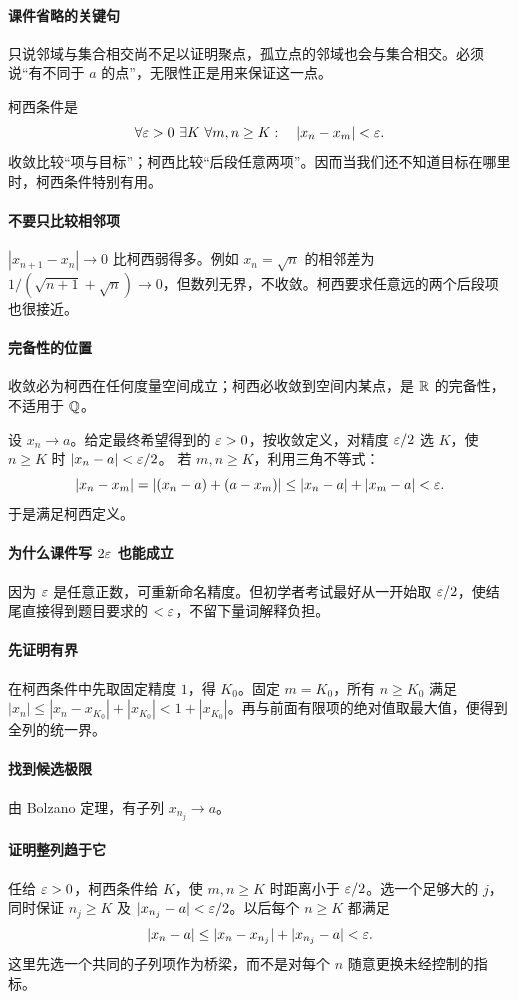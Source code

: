 \paragraph{课件省略的关键句}只说邻域与集合相交尚不足以证明聚点，孤立点的邻域也会与集合相交。必须说“有不同于 $a$ 的点”，无限性正是用来保证这一点。

柯西条件是
\[\forall\eps>0\ \exists K\ \forall m,n\ge K:\quad |x_n-x_m|<\eps.\]
收敛比较“项与目标”；柯西比较“后段任意两项”。因而当我们还不知道目标在哪里时，柯西条件特别有用。
\paragraph{不要只比较相邻项}$|x_{n+1}-x_n|\to0$ 比柯西弱得多。例如 $x_n=\sqrt n$ 的相邻差为 $1/(\sqrt{n+1}+\sqrt n)\to0$，但数列无界，不收敛。柯西要求任意远的两个后段项也很接近。
\paragraph{完备性的位置}收敛必为柯西在任何度量空间成立；柯西必收敛到空间内某点，是 $\mathbb{R}$ 的完备性，不适用于 $\mathbb{Q}$。

设 $x_n\to a$。给定最终希望得到的 $\varepsilon>0$，按收敛定义，对精度 $\varepsilon/2$ 选 $K$，使 $n\ge K$ 时 $|x_n-a|<\varepsilon/2$。
若 $m,n\ge K$，利用三角不等式：
\[|x_n-x_m|=|(x_n-a)+(a-x_m)|\le|x_n-a|+|x_m-a|<\varepsilon.\]
于是满足柯西定义。
\paragraph{为什么课件写 $2\varepsilon$ 也能成立}因为 $\varepsilon$ 是任意正数，可重新命名精度。但初学者考试最好从一开始取 $\varepsilon/2$，使结尾直接得到题目要求的 $<\varepsilon$，不留下量词解释负担。

\paragraph{先证明有界}在柯西条件中先取固定精度 $1$，得 $K_0$。固定 $m=K_0$，所有 $n\ge K_0$ 满足 $|x_n|\le|x_n-x_{K_0}|+|x_{K_0}|<1+|x_{K_0}|$。再与前面有限项的绝对值取最大值，便得到全列的统一界。
\paragraph{找到候选极限}由 Bolzano 定理，有子列 $x_{n_j}\to a$。
\paragraph{证明整列趋于它}任给 $\varepsilon>0$，柯西条件给 $K$，使 $m,n\ge K$ 时距离小于 $\varepsilon/2$。选一个足够大的 $j$，同时保证 $n_j\ge K$ 及 $|x_{n_j}-a|<\varepsilon/2$。以后每个 $n\ge K$ 都满足
\[|x_n-a|\le|x_n-x_{n_j}|+|x_{n_j}-a|<\varepsilon.\]
这里先选一个共同的子列项作为桥梁，而不是对每个 $n$ 随意更换未经控制的指标。

